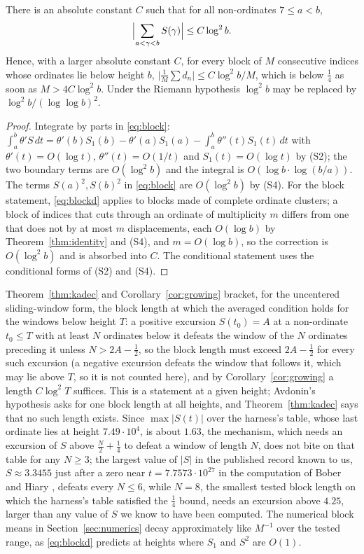 \documentclass[11pt]{article}
\begin{document}
\begin{corollary}\label{cor:growing}
There is an absolute constant $C$ such that for all non-ordinates $7\le a<b$,
\[
\Bigl|\sum_{a<\gamma<b}S(\gamma)\Bigr|\le C\log^2 b .
\]
Hence, with a larger absolute constant $C$, for every block of $M$ consecutive indices whose ordinates lie below height $b$, $\bigl|\frac1M\sum d_n\bigr|\le C\log^2 b/M$, which is below $\frac14$ as soon as $M>4C\log^2b$. Under the Riemann hypothesis $\log^2b$ may be replaced by $\log^2 b/(\log\log b)^2$.
\end{corollary}

\begin{proof}
Integrate by parts in \eqref{eq:block}: $\int_a^b\theta'S\,dt=\theta'(b)S_1(b)-\theta'(a)S_1(a)-\int_a^b\theta''(t)S_1(t)\,dt$ with $\theta'(t)=O(\log t)$, $\theta''(t)=O(1/t)$ and $S_1(t)=O(\log t)$ by (S2); the two boundary terms are $O(\log^2b)$ and the integral is $O(\log b\cdot\log(b/a))$. The terms $S(a)^2,S(b)^2$ in \eqref{eq:block} are $O(\log^2b)$ by (S4). For the block statement, \eqref{eq:blockd} applies to blocks made of complete ordinate clusters; a block of indices that cuts through an ordinate of multiplicity $m$ differs from one that does not by at most $m$ displacements, each $O(\log b)$ by Theorem~\ref{thm:identity} and (S4), and $m=O(\log b)$, so the correction is $O(\log^2b)$ and is absorbed into $C$. The conditional statement uses the conditional forms of (S2) and (S4).
\end{proof}

Theorem~\ref{thm:kadec} and Corollary~\ref{cor:growing} bracket, for the uncentered sliding-window form, the block length at which the averaged condition holds for the windows below height $T$: a positive excursion $S(t_0)=A$ at a non-ordinate $t_0\le T$ with at least $N$ ordinates below it defeats the window of the $N$ ordinates preceding it unless $N>2A-\frac12$, so the block length must exceed $2A-\frac12$ for every such excursion (a negative excursion defeats the window that follows it, which may lie above $T$, so it is not counted here), and by Corollary~\ref{cor:growing} a length $C\log^2T$ suffices. This is a statement at a given height; Avdonin's hypothesis asks for one block length at all heights, and Theorem~\ref{thm:kadec} says that no such length exists. Since $\max|S(t)|$ over the harness's table, whose last ordinate lies at height $7.49\cdot10^4$, is about $1.63$, the mechanism, which needs an excursion of $S$ above $\frac N2+\frac14$ to defeat a window of length $N$, does not bite on that table for any $N\ge3$; the largest value of $|S|$ in the published record known to us, $S\approx3.3455$ just after a zero near $t=7.7573\cdot10^{27}$ in the computation of Bober and Hiary \cite[Table 2]{Bober}, defeats every $N\le6$, while $N=8$, the smallest tested block length on which the harness's table satisfied the $\frac14$ bound, needs an excursion above $4.25$, larger than any value of $S$ we know to have been computed. The numerical block means in Section~\ref{sec:numerics} decay approximately like $M^{-1}$ over the tested range, as \eqref{eq:blockd} predicts at heights where $S_1$ and $S^2$ are $O(1)$.
\end{document}
